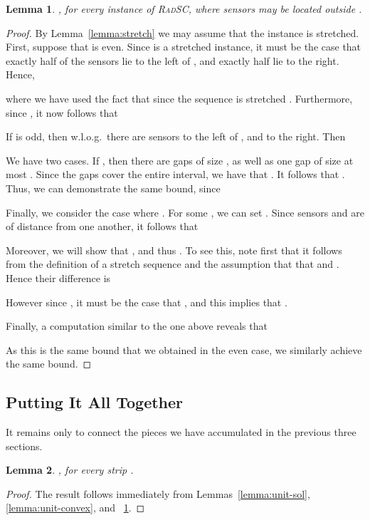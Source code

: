 \documentclass[11pt]{article}
\newtheorem{lemma}{Lemma}
\newcommand{\srsc}{\textsc{RadSC}\xspace}
\begin{document}
\begin{lemma}
\label{lemma:ratio}
, for every instance  of \srsc, where sensors may be located outside
.
\end{lemma}
\begin{proof}
By Lemma~\ref{lemma:stretch} we may assume that the instance is
stretched.  
First, suppose that  is even.  Since  is a stretched instance,
it must be the case that exactly half of the sensors lie to the left
of , and exactly half lie to the right.
Hence,

where we have used the fact that since the sequence is stretched
.  Furthermore, since , it now follows that

		
If  is odd, then w.l.o.g.\ 
there are  sensors to the left of , and
 to the right.  Then

We have two cases. 
If , then there are  gaps of size , as
well as one gap of size at most . Since the gaps cover the
entire interval, we have that .
It follows that .  Thus, we can
demonstrate the same bound, since

Finally, we consider the case where .  For some , we can set .
Since sensors  and  are of distance  from
one another, it follows that

Moreover, we will show that , and thus
.  To see this, note first
that it follows from the definition of a stretch sequence and the
assumption that  that 
and .  Hence their difference is

However since , it must be the case
that , and this implies that .

Finally, a computation similar to the one above reveals that

As this is the same bound that we obtained in the even case, we
similarly achieve the same  bound. 
\end{proof}

\subsection{Putting It All Together}

It remains only to connect the pieces we have accumulated in the previous three sections. 

\begin{lemma}
\label{lemma:strip}
, for every strip .  
\end{lemma}

\begin{proof}
The result follows immediately from Lemmas~\ref{lemma:unit-sol},
\ref{lemma:unit-convex}, and ~\ref{lemma:ratio}.
\end{proof}
\end{document}

